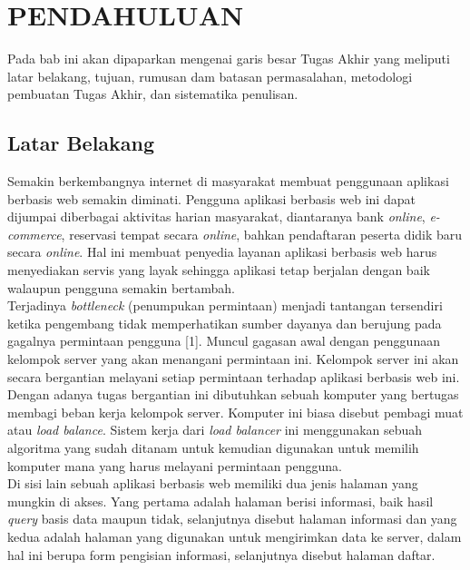 \documentclass{ta-its}
\begin{document}
    \tableofcontents %
    \listoftables %
    \listoffigures %

\mainmatter %
    \chapter{PENDAHULUAN}
        Pada bab ini akan dipaparkan mengenai garis besar Tugas Akhir yang meliputi latar belakang, tujuan, rumusan dam batasan permasalahan, metodologi pembuatan Tugas Akhir, dan sistematika penulisan.

        \section{Latar Belakang}
            Semakin berkembangnya internet di masyarakat membuat penggunaan aplikasi berbasis web semakin diminati. Pengguna aplikasi berbasis web ini dapat dijumpai diberbagai aktivitas harian masyarakat, diantaranya bank \emph{online}, \emph{e-commerce}, reservasi tempat secara \emph{online}, bahkan pendaftaran peserta didik baru secara \emph{online}. Hal ini membuat penyedia layanan aplikasi berbasis web harus menyediakan servis yang layak sehingga aplikasi tetap berjalan dengan baik walaupun pengguna semakin bertambah.\\
\indent Terjadinya \emph{bottleneck} (penumpukan permintaan) menjadi tantangan tersendiri ketika pengembang tidak memperhatikan sumber dayanya dan berujung pada gagalnya permintaan pengguna [1]. Muncul gagasan awal dengan penggunaan kelompok server yang akan menangani permintaan ini. Kelompok server ini akan secara bergantian melayani setiap permintaan terhadap aplikasi berbasis web ini. Dengan adanya tugas bergantian ini dibutuhkan sebuah komputer yang bertugas membagi beban kerja kelompok server. Komputer ini biasa disebut pembagi muat atau \emph{load balance}. Sistem kerja dari \emph{load balancer} ini menggunakan sebuah algoritma yang sudah ditanam untuk kemudian digunakan untuk memilih komputer mana yang harus melayani permintaan pengguna. \\
\indent Di sisi lain sebuah aplikasi berbasis web memiliki dua jenis halaman yang mungkin di akses. Yang pertama adalah halaman berisi informasi, baik hasil \emph{query} basis data maupun tidak, selanjutnya disebut halaman informasi dan yang kedua adalah halaman yang digunakan untuk mengirimkan data ke server, dalam hal ini berupa form pengisian informasi, selanjutnya disebut halaman daftar. \\
\end{document}
